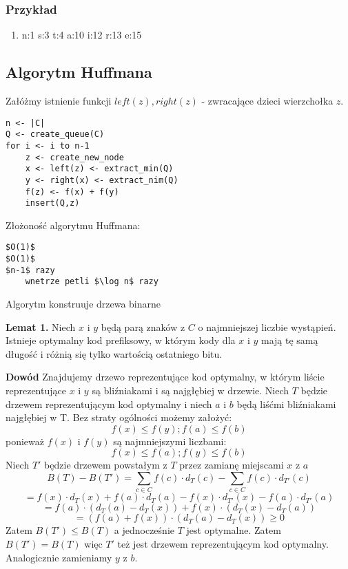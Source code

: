 \subsubsection{Przykład}
\begin{enumerate}
\item n:1 s:3 t:4 a:10 i:12 r:13 e:15
\end{enumerate}

\subsection{Algorytm Huffmana}
Załóżmy istnienie funkcji $left(z), right(z)$ - zwracające dzieci wierzchołka $z$.
\begin{lstlisting}[caption={Huffman(C,F)}]
n <- |C|
Q <- create_queue(C)
for i <- i to n-1
	z <- create_new_node
	x <- left(z) <- extract_min(Q)
	y <- right(x) <- extract_nim(Q)
	f(z) <- f(x) + f(y)
	insert(Q,z)
\end{lstlisting}
Złożoność algorytmu Huffmana:
\begin{lstlisting}
$O(1)$
$O(1)$
$n-1$ razy
	wnetrze petli $\log n$ razy
\end{lstlisting}

Algorytm konstruuje drzewa binarne

\textbf{Lemat 1.} Niech $x$ i $y$ będą parą znaków z $C$ o najmniejszej liczbie wystąpień. Istnieje optymalny kod prefiksowy, w którym kody dla $x$ i $y$ mają tę samą długość i różnią się tylko wartością ostatniego bitu.

\textbf{Dowód} Znajdujemy drzewo reprezentujące kod optymalny, w którym liście reprezentujące $x$ i $y$ są bliźniakami i są najgłębiej w drzewie. Niech $T$ będzie drzewem reprezentującym kod optymalny i niech $a$ i $b$ będą liśćmi bliźniakami najgłębiej w T. 
Bez straty ogólności możemy założyć:
$$ f(x) \leq f(y); f(a) \leq f(b) $$
ponieważ $f(x)$ i $f(y)$ są najmniejszymi liczbami:
$$ f(x) \leq f(a); f(y) \leq f(b) $$
Niech $T'$ będzie drzewem powstałym z $T$ przez zamianę miejscami $x$ z $a$
$$ B(T) - B(T') = \sum_{c \in C} f(c) \cdot d_T(c) - \sum_{c \in C} f(c) \cdot d_{T'}(c) $$
$$ = f(x) \cdot d_T(x) + f(a) \cdot d_T(a) - f(x) \cdot d_{T'}(x) - f(a) \cdot d_{T'}(a) $$
$$ = f(a) \cdot (d_T(a) - d_T(x)) + f(x) \cdot (d_T(x) - d_T(a)) $$ 
$$ = (f(a) + f(x)) \cdot (d_T(a) - d_T(x)) \geq 0$$
Zatem $B(T') \leq B(T)$ a jednocześnie $T$ jest optymalne. Zatem $B(T') = B(T)$ więc $T'$ też jest drzewem reprezentującym kod optymalny. Analogicznie zamieniamy $y$ z $b$.

